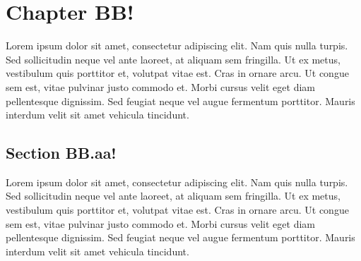 \documentclass[a4paper,10pt]{report}
\begin{document}
\chapter{Chapter BB!}
Lorem ipsum dolor sit amet, consectetur adipiscing elit. Nam quis nulla turpis. Sed sollicitudin
neque vel ante laoreet, at aliquam sem fringilla. Ut ex metus, vestibulum quis porttitor et, volutpat
vitae est. Cras in ornare arcu. Ut congue sem est, vitae pulvinar justo commodo et. Morbi cursus
velit eget diam pellentesque dignissim. Sed feugiat neque vel augue fermentum porttitor. Mauris
interdum velit sit amet vehicula tincidunt.

\section{Section BB.aa!}
Lorem ipsum dolor sit amet, consectetur adipiscing elit. Nam quis nulla turpis. Sed sollicitudin
neque vel ante laoreet, at aliquam sem fringilla. Ut ex metus, vestibulum quis porttitor et, volutpat
vitae est. Cras in ornare arcu. Ut congue sem est, vitae pulvinar justo commodo et. Morbi cursus
velit eget diam pellentesque dignissim. Sed feugiat neque vel augue fermentum porttitor. Mauris
interdum velit sit amet vehicula tincidunt.
\end{document}
